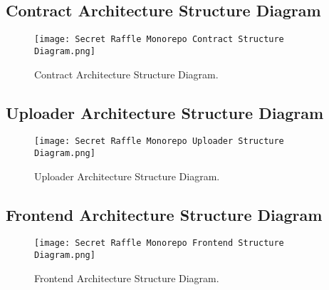 \documentclass{article}
\begin{document}
\newpage

\subsection{Contract Architecture Structure Diagram}
\begin{figure}[h]
  \vspace{0cm}
  \hspace{-3cm}
  \texttt{[image: Secret Raffle Monorepo Contract Structure Diagram.png]}
  \caption{Contract Architecture Structure Diagram.}
  \label{fig:Contract Architecture Structure Diagram Appendix}
\end{figure}

\subsection{Uploader Architecture Structure Diagram}
\begin{figure}[h]
  \vspace{0cm}
  \hspace{-3cm}
  \texttt{[image: Secret Raffle Monorepo Uploader Structure Diagram.png]}
  \caption{Uploader Architecture Structure Diagram.}
  \label{fig:Uploader Architecture Structure Diagram Appendix}
\end{figure}

\newpage

\subsection{Frontend Architecture Structure Diagram}
\begin{figure}[h]
  \vspace{0cm}
  \hspace{-3cm}
  \texttt{[image: Secret Raffle Monorepo Frontend Structure Diagram.png]}
  \caption{Frontend Architecture Structure Diagram.}
  \label{fig:Frontend Architecture Structure Diagram Appendix}
\end{figure}
\end{document}
